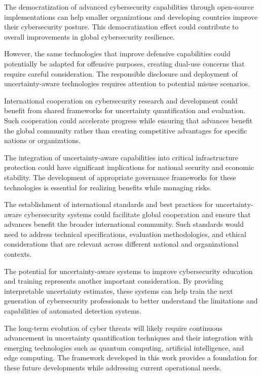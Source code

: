 \documentclass[journal]{IEEEtran}
\begin{document}
The democratization of advanced cybersecurity capabilities through open-source implementations can help smaller organizations and developing countries improve their cybersecurity posture. This democratization effect could contribute to overall improvements in global cybersecurity resilience.

However, the same technologies that improve defensive capabilities could potentially be adapted for offensive purposes, creating dual-use concerns that require careful consideration. The responsible disclosure and deployment of uncertainty-aware technologies requires attention to potential misuse scenarios.

International cooperation on cybersecurity research and development could benefit from shared frameworks for uncertainty quantification and evaluation. Such cooperation could accelerate progress while ensuring that advances benefit the global community rather than creating competitive advantages for specific nations or organizations.

The integration of uncertainty-aware capabilities into critical infrastructure protection could have significant implications for national security and economic stability. The development of appropriate governance frameworks for these technologies is essential for realizing benefits while managing risks.

The establishment of international standards and best practices for uncertainty-aware cybersecurity systems could facilitate global cooperation and ensure that advances benefit the broader international community. Such standards would need to address technical specifications, evaluation methodologies, and ethical considerations that are relevant across different national and organizational contexts.

The potential for uncertainty-aware systems to improve cybersecurity education and training represents another important consideration. By providing interpretable uncertainty estimates, these systems can help train the next generation of cybersecurity professionals to better understand the limitations and capabilities of automated detection systems.

The long-term evolution of cyber threats will likely require continuous advancement in uncertainty quantification techniques and their integration with emerging technologies such as quantum computing, artificial intelligence, and edge computing. The framework developed in this work provides a foundation for these future developments while addressing current operational needs.
\end{document}
